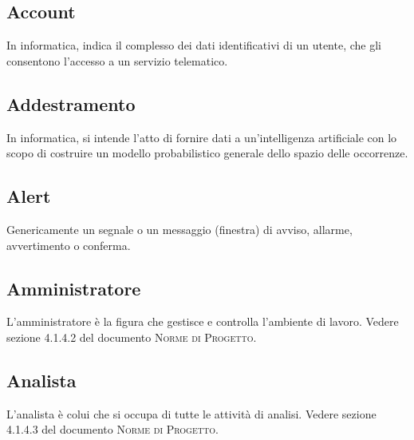

\subsection*{Account}
In informatica, indica il complesso dei dati identificativi di un utente, che gli consentono l'accesso a un servizio telematico.

\subsection*{Addestramento}
In informatica, si intende l'atto di fornire dati a un'intelligenza artificiale con lo scopo di costruire un modello probabilistico generale dello spazio delle occorrenze.

\subsection*{Alert}
Genericamente un segnale o un messaggio (finestra) di avviso, allarme, avvertimento o conferma.

\subsection*{Amministratore}
L’amministratore è la figura che gestisce e controlla l’ambiente di lavoro. Vedere sezione 4.1.4.2 del documento \textsc{Norme di Progetto}.

\subsection*{Analista}
L’analista è colui che si occupa di tutte le attività di analisi. Vedere sezione 4.1.4.3 del documento \textsc{Norme di Progetto}.


